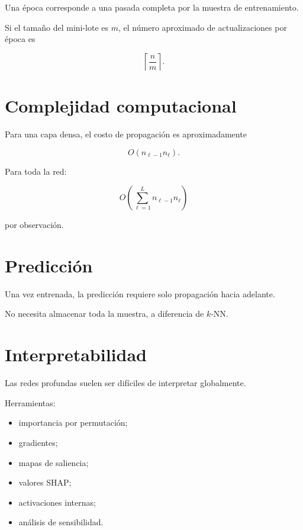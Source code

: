 \documentclass[
  spanish,
  10.5pt,
  letterpaper,
  DIV=11,
  numbers=noendperiod,
  oneside,
  open=any]{scrreprt}
\providecommand{\tightlist}{%
  \setlength{\itemsep}{0pt}\setlength{\parskip}{0pt}}
\theoremstyle{definition}
\theoremstyle{definition}
\theoremstyle{plain}
\theoremstyle{remark}
\begin{document}

Una época corresponde a una pasada completa por la muestra de
entrenamiento.

Si el tamaño del mini-lote es \(m\), el número aproximado de
actualizaciones por época es

\[
\left\lceil
\frac{n}{m}
\right\rceil.
\]

\section*{Complejidad computacional}\label{complejidad-computacional-3}


Para una capa densa, el costo de propagación es aproximadamente

\[
O
\left(
n_{\ell-1}n_\ell
\right).
\]

Para toda la red:

\[
O
\left(
\sum_{\ell=1}^{L}
n_{\ell-1}n_\ell
\right)
\]

por observación.

\section*{Predicción}\label{predicciuxf3n-2}


Una vez entrenada, la predicción requiere solo propagación hacia
adelante.

No necesita almacenar toda la muestra, a diferencia de \(k\)-NN.

\section*{Interpretabilidad}\label{interpretabilidad}


Las redes profundas suelen ser difíciles de interpretar globalmente.

Herramientas:

\begin{itemize}
\tightlist
\item
  importancia por permutación;
\item
  gradientes;
\item
  mapas de saliencia;
\item
  valores SHAP;
\item
  activaciones internas;
\item
  análisis de sensibilidad.
\end{itemize}
\end{document}
